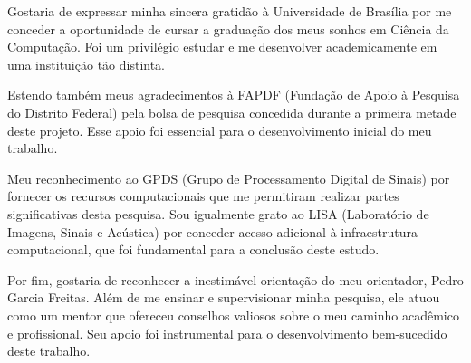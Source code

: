 Gostaria de expressar minha sincera gratidão à Universidade de Brasília por me conceder a oportunidade de cursar a graduação dos meus sonhos em Ciência da Computação. Foi um privilégio estudar e me desenvolver academicamente em uma instituição tão distinta.

Estendo também meus agradecimentos à FAPDF (Fundação de Apoio à Pesquisa do Distrito Federal) pela bolsa de pesquisa concedida durante a primeira metade deste projeto. Esse apoio foi essencial para o desenvolvimento inicial do meu trabalho.

Meu reconhecimento ao GPDS (Grupo de Processamento Digital de Sinais) por fornecer os recursos computacionais que me permitiram realizar partes significativas desta pesquisa. Sou igualmente grato ao LISA (Laboratório de Imagens, Sinais e Acústica) por conceder acesso adicional à infraestrutura computacional, que foi fundamental para a conclusão deste estudo.

Por fim, gostaria de reconhecer a inestimável orientação do meu orientador, Pedro Garcia Freitas. Além de me ensinar e supervisionar minha pesquisa, ele atuou como um mentor que ofereceu conselhos valiosos sobre o meu caminho acadêmico e profissional. Seu apoio foi instrumental para o desenvolvimento bem-sucedido deste trabalho.

